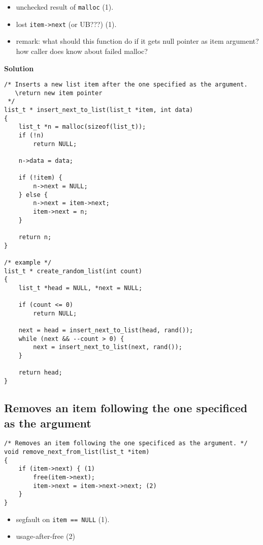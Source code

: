 \documentclass[a4paper,12pt]{article}
\begin{document}
\begin{itemize}
	\item[\textcolor{black}\textbullet] unchecked result of \verb|malloc| (1).
	\item[\textcolor{black}\textbullet] lost \verb|item->next| (or UB???) (1).
	\item[\textcolor{black}\textbullet] remark: what should this function do if it gets null pointer as item argument? how caller does know about failed malloc?
\end{itemize}

\textbf{Solution}
\begin{lstlisting}
/* Inserts a new list item after the one specified as the argument. 
   \return new item pointer
 */
list_t * insert_next_to_list(list_t *item, int data)
{
	list_t *n = malloc(sizeof(list_t));
	if (!n)
		return NULL;

	n->data = data;

	if (!item) {
		n->next = NULL;
	} else {
		n->next = item->next;
		item->next = n;
	}
	
	return n;
}

/* example */
list_t * create_random_list(int count)
{
	list_t *head = NULL, *next = NULL;
	
	if (count <= 0)
		return NULL;

	next = head = insert_next_to_list(head, rand());
	while (next && --count > 0) {
		next = insert_next_to_list(next, rand());
	}

	return head;
}

\end{lstlisting}

\pagebreak

\subsection{Removes an item following the one specificed as the argument}

\begin{lstlisting}
/* Removes an item following the one specificed as the argument. */
void remove_next_from_list(list_t *item)
{
	if (item->next) { (1)
		free(item->next);
		item->next = item->next->next; (2)
	}
}
\end{lstlisting}

\begin{itemize}
	\item[\textcolor{black}\textbullet] segfault on \verb|item == NULL| (1).
	\item[\textcolor{black}\textbullet] usage-after-free (2)
\end{itemize}
\end{document}
